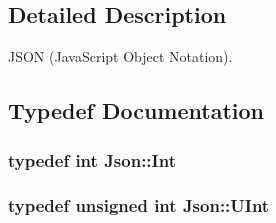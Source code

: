 \subsection{Detailed Description}
J\-S\-O\-N (Java\-Script Object Notation). 

\subsection{Typedef Documentation}
\hypertarget{namespaceJson_a08122e8005b706d982e48cca1e2119c7}{
\subsubsection[{Int}]{\setlength{\rightskip}{0pt plus 5cm}typedef int {\bf Json\-::\-Int}}}\label{d7/d03/namespaceJson_a08122e8005b706d982e48cca1e2119c7}
\hypertarget{namespaceJson_a800fb90eb6ee8d5d62b600c06f87f7d4}{
\subsubsection[{U\-Int}]{\setlength{\rightskip}{0pt plus 5cm}typedef unsigned int {\bf Json\-::\-U\-Int}}}\label{d7/d03/namespaceJson_a800fb90eb6ee8d5d62b600c06f87f7d4}


